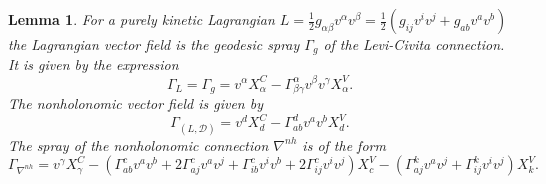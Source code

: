 \documentclass[11pt]{article}
\newtheorem{lem}{Lemma}
\begin{document}
\begin{lem} \label{lem:VF} For a  purely kinetic Lagrangian
$
L=\frac{1}{2} g_{\alpha\beta}v^\alpha v^\beta = \frac{1}{2}\left(g_{ij} v^{i} v^{j}+g_{a b} v^{a} v^{b}\right) 
$
the  Lagrangian vector field is the geodesic spray $\Gamma_g$ of the Levi-Civita connection. It is given by the expression 
\[
\Gamma_L= \Gamma_g= v^\alpha X^C_\alpha - \Gamma^\alpha_{\beta\gamma}v^\beta v^\gamma X^V_\alpha.
\]
The nonholonomic vector field is given by
 $$\Gamma_{(L, \mathcal{D})}=v^{d} X_{d}^{C}-\Gamma_{a b}^{d} v^{a} v^{b}  X_{d}^{V}.
$$ 
The spray of the nonholonomic connection $\nabla^{nh}$ is of the form 
$$\Gamma_{\nabla^{nh}}=v^\gamma X_\gamma^C-\left(\Gamma_{a b}^{c} v^a v^b+2 \Gamma_{a j}^c v^a v^j+\Gamma_{i b}^c v^i v^b+2 \Gamma_{ij}^c v^iv^j\right) X_c^V 
-\left(\Gamma_{a j}^k v^a v^j+\Gamma_{ij}^k v^i v^j\right) X_k^V.
$$ 
\end{lem}
\end{document}
